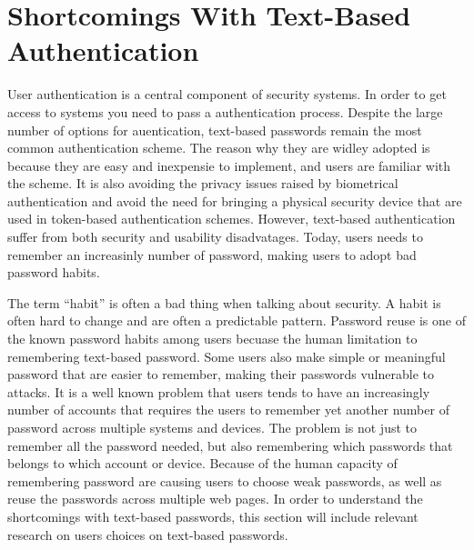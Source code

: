 \section{Shortcomings With Text-Based Authentication} 

  User authentication is a central component of security systems. In order to get access to systems you need to pass a authentication process. Despite the large number of options for auentication, text-based passwords remain the most common authentication scheme. The reason why they are widley adopted is because they are easy and inexpensie to implement, and users are familiar with the scheme. It is also avoiding the privacy issues raised by biometrical authentication and avoid the need for bringing a physical security device that are used in token-based authentication schemes. However, text-based authentication suffer from both security and usability disadvatages. Today, users needs to remember an increasinly number of password, making users to adopt bad password habits. 

  The term ``habit'' is often a bad thing when talking about security. A habit is often hard to change and are often a predictable pattern. Password reuse is one of the known password habits among users becuase the human limitation to remembering text-based password. Some users also make simple or meaningful password that are easier to remember, making their passwords vulnerable to attacks.
  It is a well known problem that users tends to have an increasingly number of accounts that requires the users to remember yet another number of password across multiple systems and devices. The problem is not just to remember all the password needed, but also remembering which passwords that belongs to which account or device. Because of the human capacity of remembering password are causing users to choose weak passwords, as well as reuse the passwords across multiple web pages. In order to understand the shortcomings with text-based passwords, this section will include relevant research on users choices on text-based passwords.  

